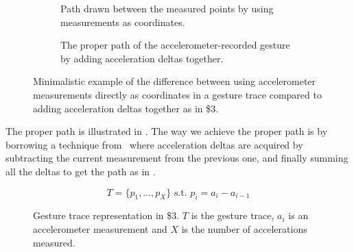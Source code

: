 \begin{figure}[h]
    \begin{subfigure}{.5\linewidth}
    \caption{Path drawn between the measured points by using measurements as coordinates.}
\label{fig:accelerometerpath}
    \end{subfigure}
    \begin{subfigure}{.5\linewidth}
    \caption{The proper path of the accelerometer-recorded gesture by adding acceleration deltas together.}
\label{fig:acceleromterpath-proper}
    \end{subfigure}
\caption{Minimalistic example of the difference between using accelerometer measurements directly as coordinates in a gesture trace compared to adding acceleration deltas together as in \$3.}
\end{figure}

The proper path is illustrated in .
The way we achieve the proper path is by borrowing a technique from~\cite{threedollar} where acceleration deltas are acquired by subtracting the current measurement from the previous one, and finally summing all the deltas to get the path as in .

\begin{figure}[h]
\[ T = \{p_1,\ldots,p_X\} \text{ s.t. } p_i=a_i-a_{i-1} \]
\caption{Gesture trace representation in \$3. $T$ is the gesture trace, $a_i$ is an accelerometer measurement and $X$ is the number of accelerations measured.}
\label{eq:acceleration-timeseries-duplicate}
\end{figure}